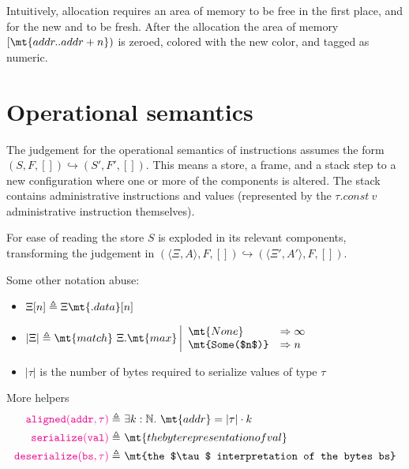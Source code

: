 \documentclass{article}
\newcommand{\newt}[1]{\mathtt{\color{magenta}{#1}}}
\newcommand{\ang}[1]{\langle #1\rangle}
\newcommand{\match}[5]{\mt{match}~#1\left|\begin{array}{ll}#2 &\Rightarrow #3 \\ #4 &\Rightarrow #5 \end{array}\right.}
\newcommand{\none}{\mt{None}}
\newcommand{\some}[1]{\mt{Some(#1)}}
\begin{document}
Intuitively, allocation requires an area of memory to be free in the first place, and
for the new  and  to be fresh. After the allocation the area of memory
$[\mt{addr..addr+n})$ is zeroed, colored with the new color, and tagged as numeric.

\section{Operational semantics}
The judgement for the operational semantics of instructions assumes the form
$ (S, F, []) \hookrightarrow (S', F', []) $. This means a store, a frame, and a stack
step to a new configuration where one or more of the components is altered.
The stack contains administrative instructions and values (represented by the
$\tau.const~v$ administrative instruction themselves).

For ease of reading the store $S$ is exploded in its relevant components, transforming
the judgement in $ (\ang{\Xi, A}, F, []) \hookrightarrow (\ang{\Xi', A'}, F, []) $.

Some other notation abuse:
\begin{itemize}
    \item $\Xi[n] \triangleq \Xi\mt{.data}[n]$
    \item $|\Xi| \triangleq \match{\Xi.\mt{max}}{\none}{\infty}{\some{$n$}}{n}$
    \item $|\tau|$ is the number of bytes required to serialize values of type $\tau$
\end{itemize}

More helpers
\begin{align*}
    \newt{aligned(addr,\tau)} \triangleq&~ \exists k:\mathbb N.~\mt{addr} = |\tau|\cdot k \\
    \newt{serialize(val)} \triangleq&~ \mt{the byte representation of val} \\
    \newt{deserialize(bs,\tau)} \triangleq&~ \mt{the $\tau$ interpretation of the bytes bs}
\end{align*}
\end{document}
